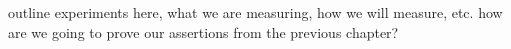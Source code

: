 \label{section:experiments}
\color{red}
outline experiments here, what we are measuring, how we will measure, etc. how are we going to prove our assertions from the previous chapter?
\color{black}
